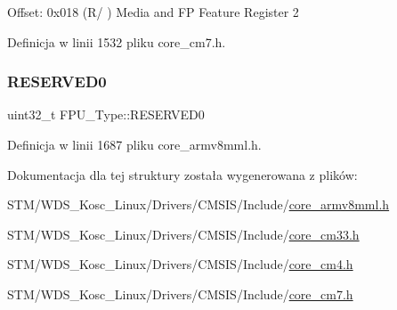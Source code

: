 Offset\+: 0x018 (R/ ) Media and FP Feature Register 2 

Definicja w linii 1532 pliku core\+\_\+cm7.\+h.

\mbox{\label{struct_f_p_u___type_aeab77b3f17bf5a628cb743807d8fde7e}} 
\subsubsection{\texorpdfstring{R\+E\+S\+E\+R\+V\+E\+D0}{RESERVED0}}
{\footnotesize\ttfamily uint32\+\_\+t F\+P\+U\+\_\+\+Type\+::\+R\+E\+S\+E\+R\+V\+E\+D0}



Definicja w linii 1687 pliku core\+\_\+armv8mml.\+h.



Dokumentacja dla tej struktury została wygenerowana z plików\+:\begin{DoxyCompactItemize}
\item 
S\+T\+M/\+W\+D\+S\+\_\+\+Kosc\+\_\+\+Linux/\+Drivers/\+C\+M\+S\+I\+S/\+Include/\hyperlink{core__armv8mml_8h}{core\+\_\+armv8mml.\+h}\item 
S\+T\+M/\+W\+D\+S\+\_\+\+Kosc\+\_\+\+Linux/\+Drivers/\+C\+M\+S\+I\+S/\+Include/\hyperlink{core__cm33_8h}{core\+\_\+cm33.\+h}\item 
S\+T\+M/\+W\+D\+S\+\_\+\+Kosc\+\_\+\+Linux/\+Drivers/\+C\+M\+S\+I\+S/\+Include/\hyperlink{core__cm4_8h}{core\+\_\+cm4.\+h}\item 
S\+T\+M/\+W\+D\+S\+\_\+\+Kosc\+\_\+\+Linux/\+Drivers/\+C\+M\+S\+I\+S/\+Include/\hyperlink{core__cm7_8h}{core\+\_\+cm7.\+h}\end{DoxyCompactItemize}
